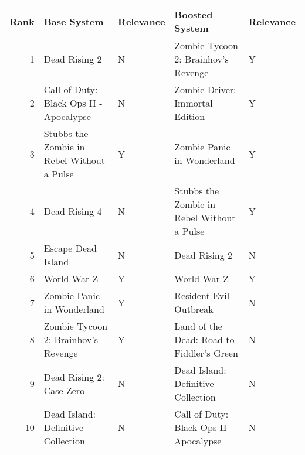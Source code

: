 \begin{tabular}{rllll}
\toprule
Rank & Base System & Relevance & Boosted System & Relevance \\
\midrule
1 & Dead Rising 2 & N & Zombie Tycoon 2: Brainhov's Revenge & Y \\
2 & Call of Duty: Black Ops II - Apocalypse & N & Zombie Driver: Immortal Edition & Y \\
3 & Stubbs the Zombie in Rebel Without a Pulse & Y & Zombie Panic in Wonderland & Y \\
4 & Dead Rising 4 & N & Stubbs the Zombie in Rebel Without a Pulse & Y \\
5 & Escape Dead Island & N & Dead Rising 2 & N \\
6 & World War Z & Y & World War Z & Y \\
7 & Zombie Panic in Wonderland & Y & Resident Evil Outbreak & N \\
8 & Zombie Tycoon 2: Brainhov's Revenge & Y & Land of the Dead: Road to Fiddler's Green & N \\
9 & Dead Rising 2: Case Zero & N & Dead Island: Definitive Collection & N \\
10 & Dead Island: Definitive Collection & N & Call of Duty: Black Ops II - Apocalypse & N \\
\bottomrule
\end{tabular}
